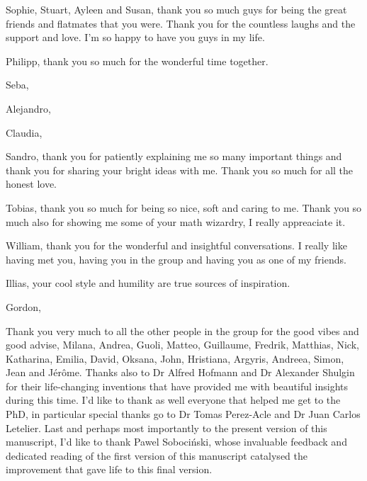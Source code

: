 \documentclass[phd,lfcs]{infthesis}
\begin{document}
\begin{preliminary}
\begin{acknowledgements}
  Sophie, Stuart, Ayleen and Susan, thank you so much guys for
  being the great friends and flatmates that you were.
  Thank you for the countless laughs and the support and love.
  I'm so happy to have you guys in my life.

  Philipp, thank you so much for the wonderful time together.

  Seba,

  Alejandro,

  Claudia,

  Sandro, thank you for patiently explaining me so many important things
  and thank you for sharing your bright ideas with me.
  Thank you so much for all the honest love.

  Tobias, thank you so much for being so nice, soft and caring to me. %
  Thank you so much also for showing me some of your math wizardry,
  I really appreaciate it.

  William, thank you for the wonderful and insightful conversations. %
  I really like having met you, having you in the group
  and having you as one of my friends.

  Illias, your cool style and humility are true sources of inspiration.

  Gordon,

  Thank you very much to all the other people in the group
  for the good vibes and good advise,
  Milana, Andrea, Guoli, Matteo, Guillaume, Fredrik, Matthias, Nick,
  Katharina, Emilia, David, Oksana, John, Hristiana,
  Argyris, Andreea, Simon, Jean and J\'er\^ome.
  Thanks also to Dr Alfred Hofmann and Dr Alexander Shulgin
  for their life-changing inventions that have provided me
  with beautiful insights during this time.
  I'd like to thank as well everyone that helped me get to the PhD,
  in particular special thanks go to Dr Tomas Perez-Acle
  and Dr Juan Carlos Letelier. %
  Last and perhaps most importantly to the present version
  of this manuscript, I'd like to thank Pawel Sobociński,
  whose invaluable feedback and dedicated reading of the first
  version of this manuscript catalysed %
  the improvement that gave life to this final version.
\end{acknowledgements}
\fi

\standarddeclaration


\tableofcontents


\end{preliminary}
\end{document}
